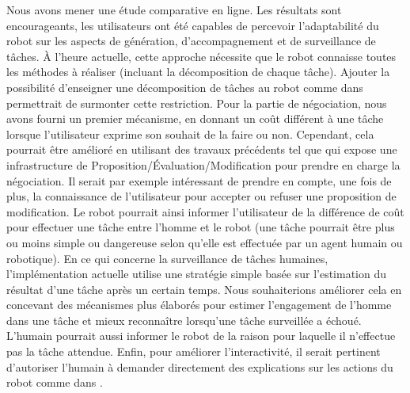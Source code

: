 \documentclass[a4paper,11pt,twoside]{StyleThese}
\begin{document}
Nous avons mener une étude comparative en ligne. Les résultats sont encourageants, les utilisateurs ont été capables de percevoir l'adaptabilité du robot sur les aspects de génération, d'accompagnement et de surveillance de tâches.
%
À l'heure actuelle, cette approche nécessite que le robot connaisse toutes les méthodes à réaliser (incluant la décomposition de chaque tâche). Ajouter la possibilité d'enseigner une décomposition de tâches au robot comme dans  \cite{Mohseni2015} permettrait de surmonter cette restriction.
Pour la partie de négociation, nous avons fourni un premier mécanisme, en donnant un coût différent à une tâche lorsque l'utilisateur exprime son souhait de la faire ou non. Cependant, cela pourrait être amélioré en utilisant des travaux précédents tel que \cite{chu2000conflict} qui expose une infrastructure de Proposition/Évaluation/Modification pour prendre en charge la négociation.
Il serait par exemple intéressant de prendre en compte, une fois de plus, la connaissance de l'utilisateur pour accepter ou refuser une proposition de modification. Le robot pourrait ainsi informer l'utilisateur de la différence de coût pour effectuer une tâche entre l'homme et le robot (une tâche pourrait être plus ou moins simple ou dangereuse selon qu'elle est effectuée par un agent humain ou robotique).
En ce qui concerne la surveillance de tâches humaines, l'implémentation actuelle utilise une stratégie simple basée sur l'estimation du résultat d'une tâche après un certain temps. Nous souhaiterions améliorer cela en concevant des mécanismes plus élaborés pour estimer l'engagement de l'homme dans une tâche et mieux reconnaître lorsqu'une tâche surveillée a échoué. L'humain pourrait aussi informer le robot de la raison pour laquelle il n'effectue pas la tâche attendue.
Enfin, pour améliorer l'interactivité, il serait pertinent d'autoriser l'humain à demander directement des explications sur les actions du robot comme dans  \cite{Lomas2012}.



\ifdefined{}
\else


\end{document}
